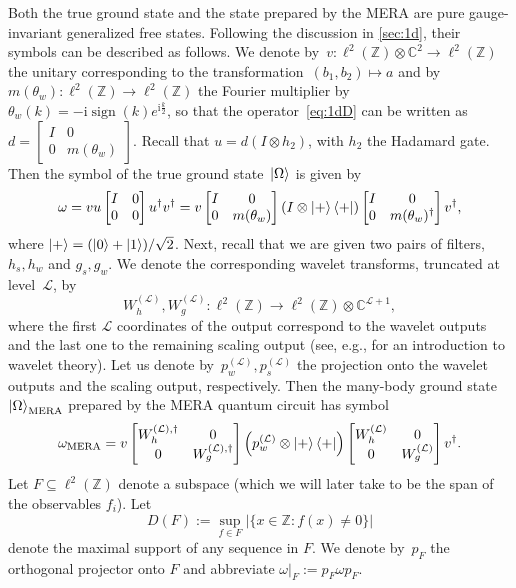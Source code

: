 \documentclass[aps,pra,reprint,superscriptaddress,floatfix,amsmath,amssymb,amsfonts]{revtex4-1}
\DeclareMathOperator{\sign}{sign}
\newcommand*{\Z}{\mathbb Z}
\newcommand*{\C}{\mathbb C}
\newcommand*{\rmi}{\mathrm{i}}
\newcommand*{\ot}{\otimes}
\begin{document}
Both the true ground state and the state prepared by the MERA are pure gauge-invariant generalized free states.
Following the discussion in \cref{sec:1d}, their symbols can be described as follows.
We denote by~$v\colon\ell^2(\Z)\ot\C^2\to\ell^2(\Z)$ the unitary corresponding to the transformation~$(b_1,b_2) \mapsto a$ and by~$m(\theta_w)\colon\ell^2(\Z)\to\ell^2(\Z)$ the Fourier multiplier by~$\theta_w(k)=-\rmi\sign(k)e^{\rmi\frac k2}$, so that the operator~\eqref{eq:1dD} can be written as $d = \left[\begin{smallmatrix}I & 0\\0 & m(\theta_w)\end{smallmatrix}\right]$. Recall that $u=d (I \ot h_2)$, with $h_2$ the Hadamard gate.
Then the symbol of the true ground state~$\ket\Omega$ is given by
\begin{equation}\label{eq:symbol true}
\omega
= v u \begin{bmatrix}I & 0 \\ 0 & 0\end{bmatrix} u^\dagger v^\dagger
= v \begin{bmatrix}I & 0\\0 & m(\theta_w)\end{bmatrix} \left( I \ot \ket+\bra+ \right) \begin{bmatrix}I & 0\\0 & m(\theta_w)^\dagger\end{bmatrix} v^\dagger,
\end{equation}
where $\ket+ = (\ket0+\ket1)/\sqrt2$.
Next, recall that we are given two pairs of filters, $h_s,h_w$ and $g_s,g_w$.
We denote the corresponding wavelet transforms, truncated at level~$\mathcal L$, by
\[ W_h^{(\mathcal L)}, W_g^{(\mathcal L)} \colon \ell^2(\Z) \to \ell^2(\Z) \ot \C^{\mathcal L+1}, \]
where the first $\mathcal L$ coordinates of the output correspond to the wavelet outputs and the last one to the remaining scaling output (see, e.g., \cite{mallat2008wavelet} for an introduction to wavelet theory).
Let us denote by~$p_w^{(\mathcal L)},p_s^{(\mathcal L)}$ the projection onto the wavelet outputs and the scaling output, respectively.
Then the many-body ground state~$\ket\Omega_{\text{MERA}}$ prepared by the MERA quantum circuit has symbol
\begin{equation}\label{eq:symbol approx}
\omega_{\text{MERA}}
= v \begin{bmatrix}W_h^{(\mathcal L),\dagger} & 0\\0 & W_g^{(\mathcal L),\dagger}\end{bmatrix} \left( p_w^{(\mathcal L)} \ot \ket+\bra+ \right) \begin{bmatrix}W_h^{(\mathcal L)} & 0\\0 & W_g^{(\mathcal L)}\end{bmatrix} v^\dagger.
\end{equation}
Let $F \subseteq \ell^2(\Z)$ denote a subspace (which we will later take to be the span of the observables $f_i$).
Let
\[ D(F) := \sup_{f\in F} \lvert\{ x\in\Z : f(x)\neq0 \}\rvert \]
denote the maximal support of any sequence in $F$.
We denote by~$p_F$ the orthogonal projector onto $F$ and abbreviate $\omega|_F := p_F \omega p_F$.
\end{document}
